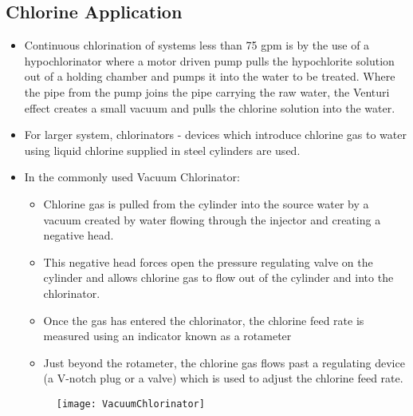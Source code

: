 \subsection{Chlorine Application}
\begin{itemize}
\item Continuous chlorination of systems less than 75 gpm is by the use of a hypochlorinator where a motor driven pump pulls the hypochlorite solution out of a holding chamber and pumps it into the water to be treated.  Where the pipe from the pump joins the pipe carrying the raw water, the Venturi effect creates a small vacuum and pulls the chlorine solution into the water.
\item For larger system, chlorinators - devices which introduce chlorine gas to water using liquid chlorine supplied in steel cylinders are used.
\item In the commonly used Vacuum Chlorinator:
\begin{itemize}
\item Chlorine gas is pulled from the cylinder into the source water by a vacuum created by water flowing through the injector and creating a negative head. 
\item This negative head forces open the pressure regulating valve on the cylinder and allows chlorine gas to flow out of the cylinder and into the chlorinator.
\item Once the gas has entered the chlorinator, the chlorine feed rate is measured using an indicator known as a rotameter
\item Just beyond the rotameter, the chlorine gas flows past a regulating device (a V-notch plug or a valve) which is used to adjust the chlorine feed rate.
\end{itemize}
\begin{figure}[h]
\begin{center}
\texttt{[image: VacuumChlorinator]}\\
\end{center}
\end{figure}
\end{itemize}
\vspace{-2em}
